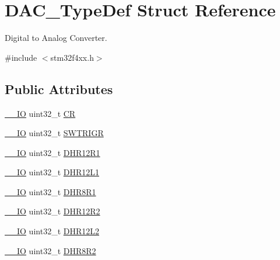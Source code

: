 \hypertarget{struct_d_a_c___type_def}{}\section{D\+A\+C\+\_\+\+Type\+Def Struct Reference}
\label{struct_d_a_c___type_def}


Digital to Analog Converter.  




{\ttfamily \#include $<$stm32f4xx.\+h$>$}

\subsection*{Public Attributes}
\begin{DoxyCompactItemize}
\item 
\hyperlink{core__cm4_8h_aec43007d9998a0a0e01faede4133d6be}{\+\_\+\+\_\+\+IO} uint32\+\_\+t \hyperlink{struct_d_a_c___type_def_a394324f0b573837ca15a87127b2a37ea}{CR}
\item 
\hyperlink{core__cm4_8h_aec43007d9998a0a0e01faede4133d6be}{\+\_\+\+\_\+\+IO} uint32\+\_\+t \hyperlink{struct_d_a_c___type_def_a4ccb66068a1ebee1179574dda20206b6}{S\+W\+T\+R\+I\+GR}
\item 
\hyperlink{core__cm4_8h_aec43007d9998a0a0e01faede4133d6be}{\+\_\+\+\_\+\+IO} uint32\+\_\+t \hyperlink{struct_d_a_c___type_def_afbfd2855cdb81939b4efc58e08aaf3e5}{D\+H\+R12\+R1}
\item 
\hyperlink{core__cm4_8h_aec43007d9998a0a0e01faede4133d6be}{\+\_\+\+\_\+\+IO} uint32\+\_\+t \hyperlink{struct_d_a_c___type_def_a5eb63912e39085e3e13d64bdb0cf38bd}{D\+H\+R12\+L1}
\item 
\hyperlink{core__cm4_8h_aec43007d9998a0a0e01faede4133d6be}{\+\_\+\+\_\+\+IO} uint32\+\_\+t \hyperlink{struct_d_a_c___type_def_a3a382d341fb608a04390bacb8c00b0f0}{D\+H\+R8\+R1}
\item 
\hyperlink{core__cm4_8h_aec43007d9998a0a0e01faede4133d6be}{\+\_\+\+\_\+\+IO} uint32\+\_\+t \hyperlink{struct_d_a_c___type_def_ab1f777540c487c26bf27e6fa37a644cc}{D\+H\+R12\+R2}
\item 
\hyperlink{core__cm4_8h_aec43007d9998a0a0e01faede4133d6be}{\+\_\+\+\_\+\+IO} uint32\+\_\+t \hyperlink{struct_d_a_c___type_def_a9f612b6b3e065e810e5a2fb254d6a40b}{D\+H\+R12\+L2}
\item 
\hyperlink{core__cm4_8h_aec43007d9998a0a0e01faede4133d6be}{\+\_\+\+\_\+\+IO} uint32\+\_\+t \hyperlink{struct_d_a_c___type_def_a3b096b71656f8fb32cd18b4c8b1d2334}{D\+H\+R8\+R2}

\end{DoxyCompactItemize}
